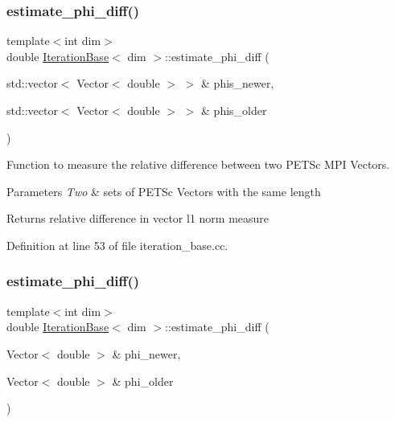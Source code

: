 \subsubsection{\texorpdfstring{estimate\+\_\+phi\+\_\+diff()}{estimate\_phi\_diff()}\hspace{0.1cm}{\footnotesize\ttfamily [3/4]}}
{\footnotesize\ttfamily template$<$int dim$>$ \\
double \hyperlink{class_iteration_base}{Iteration\+Base}$<$ dim $>$\+::estimate\+\_\+phi\+\_\+diff (\begin{DoxyParamCaption}\item[{std\+::vector$<$ Vector$<$ double $>$ $>$ \&}]{phis\+\_\+newer,  }\item[{std\+::vector$<$ Vector$<$ double $>$ $>$ \&}]{phis\+\_\+older }\end{DoxyParamCaption})\hspace{0.3cm}{\ttfamily [protected]}}

Function to measure the relative difference between two P\+E\+T\+Sc M\+PI Vectors.


\begin{DoxyParams}{Parameters}
{\em Two} & sets of P\+E\+T\+Sc Vectors with the same length \\
\hline
\end{DoxyParams}
\begin{DoxyReturn}{Returns}
relative difference in vector l1 norm measure 
\end{DoxyReturn}


Definition at line 53 of file iteration\+\_\+base.\+cc.

\mbox{\label{class_iteration_base_ab46bde988ac6dc1b84ebb78665414785}} 
\subsubsection{\texorpdfstring{estimate\+\_\+phi\+\_\+diff()}{estimate\_phi\_diff()}\hspace{0.1cm}{\footnotesize\ttfamily [4/4]}}
{\footnotesize\ttfamily template$<$int dim$>$ \\
double \hyperlink{class_iteration_base}{Iteration\+Base}$<$ dim $>$\+::estimate\+\_\+phi\+\_\+diff (\begin{DoxyParamCaption}\item[{Vector$<$ double $>$ \&}]{phi\+\_\+newer,  }\item[{Vector$<$ double $>$ \&}]{phi\+\_\+older }\end{DoxyParamCaption})\hspace{0.3cm}{\ttfamily [protected]}}

